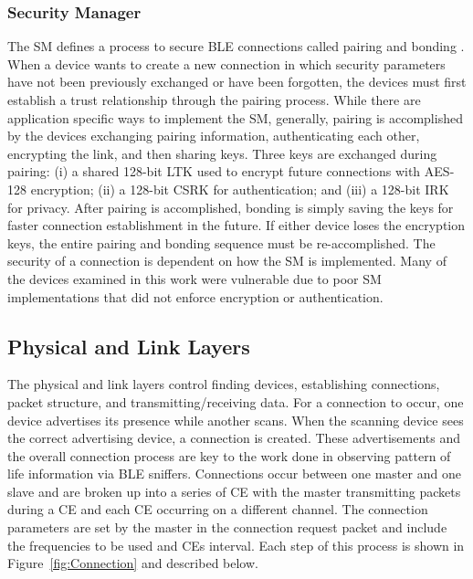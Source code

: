 \documentclass[12pt,letterpaper,oneside]{book}
\begin{document}
				\subsubsection{Security Manager}
				The \ac{SM} defines a process to secure \ac{BLE} connections called pairing and bonding \cite{rHeydon}. When a device wants to create a new connection in which security parameters have not been previously exchanged or have been forgotten, the devices must first establish a trust relationship through the pairing process. While there are application specific ways to implement the \ac{SM}, generally, pairing is accomplished by the devices exchanging pairing information, authenticating each other, encrypting the link, and then sharing keys. Three keys are exchanged during pairing: (i) a shared 128-bit \ac{LTK} used to encrypt future connections with \ac{AES}-128 encryption; (ii) a 128-bit \ac{CSRK} for authentication; and (iii) a 128-bit \ac{IRK} for privacy. After pairing is accomplished, bonding is simply saving the keys for faster connection establishment in the future. If either device loses the encryption keys, the entire pairing and bonding sequence must be re-accomplished. The security of a connection is dependent on how the \ac{SM} is implemented. Many of the devices examined in this work were vulnerable due to poor \ac{SM} implementations that did not enforce encryption or authentication.
				
				\subsection{Physical and Link Layers}
				The physical and link layers control finding devices, establishing connections, packet structure, and transmitting/receiving data. For a connection to occur, one device advertises its presence while another scans. When the scanning device sees the correct advertising device, a connection is created. These advertisements and the overall connection process are key to the work done in observing pattern of life information via \ac{BLE} sniffers. Connections occur between one master and one slave and are broken up into a series of \ac{CE} with the master transmitting packets during a \ac{CE} and each \ac{CE} occurring on a different channel. The connection parameters are set by the master in the connection request packet and include the frequencies to be used and \ac{CE}s interval. Each step of this process is shown in Figure~\ref{fig:Connection} and described below.
				
				\figConnection
				
\end{document}
